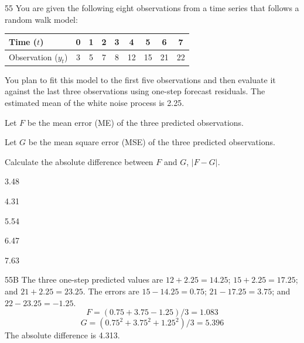 \begin{question}{55}
You are given the following eight observations from a time series that follows a random walk model:
\begin{center}
\begin{tabular}{|l|c|c|c|c|c|c|c|c|}
\hline
Time ($t$) & 0 & 1 & 2 & 3 & 4 & 5 & 6 & 7 \\ \hline
Observation ($y_t$) & 3 & 5 & 7 & 8 & 12 & 15 & 21 & 22 \\ \hline
\end{tabular}
\end{center}

You plan to fit this model to the first five observations and then evaluate it against the last three observations using one-step forecast residuals. The estimated mean of the white noise process is 2.25.

Let $F$ be the mean error (ME) of the three predicted observations.

Let $G$ be the mean square error (MSE) of the three predicted observations.

Calculate the absolute difference between $F$ and $G$, $|F - G|$.

\begin{choices}
\item 3.48
\item 4.31
\item 5.54
\item 6.47
\item 7.63
\end{choices}
\end{question}
\begin{solution}{55}{B}
The three one-step predicted values are $12 + 2.25 = 14.25$; $15 + 2.25 = 17.25$; and $21 + 2.25 = 23.25$. The errors are $15 - 14.25 = 0.75$; $21 - 17.25 = 3.75$; and $22 - 23.25 = -1.25$.
\[ F = (0.75 + 3.75 - 1.25)/3 = 1.083 \]
\[ G = (0.75^2 + 3.75^2 + 1.25^2)/3 = 5.396 \]
The absolute difference is 4.313.
\end{solution}

